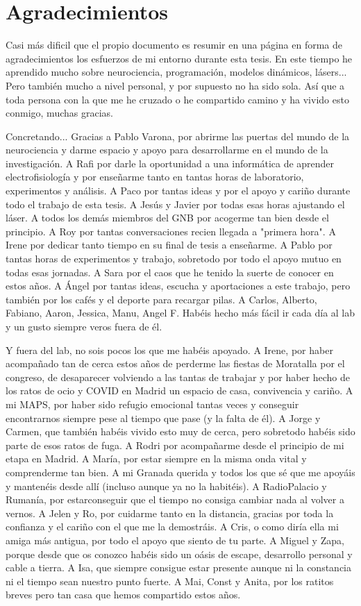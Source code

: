 \chapter*{Agradecimientos}
Casi más dificil que el propio documento es resumir en una página en forma de agradecimientos los esfuerzos de mi entorno durante esta tesis. En este tiempo he aprendido mucho sobre neurociencia, programación, modelos dinámicos, lásers... Pero también mucho a nivel personal, y por supuesto no ha sido sola. Así que a toda persona con la que me he cruzado o he compartido camino y ha vivido esto conmigo, muchas gracias. 

Concretando... Gracias a Pablo Varona, por abrirme las puertas del mundo de la neurociencia y darme espacio y apoyo para desarrollarme en el mundo de la investigación. A Rafi por darle la oportunidad a una informática de aprender electrofisiología y por enseñarme tanto en tantas horas de laboratorio, experimentos y análisis. A Paco por tantas ideas y por el apoyo y cariño durante todo el trabajo de esta tesis. A Jesús y Javier por todas esas horas ajustando el láser. A todos los demás miembros del GNB por acogerme tan bien desde el principio. A Roy por tantas conversaciones recien llegada a "primera hora". A Irene por dedicar tanto tiempo en su final de tesis a enseñarme. A Pablo por tantas horas de experimentos y trabajo, sobretodo por todo el apoyo mutuo en todas esas jornadas. A Sara por el caos que he tenido la suerte de conocer en estos años. A Ángel por tantas ideas, escucha y aportaciones a este trabajo, pero también por los cafés y el deporte para recargar pilas. A Carlos, Alberto, Fabiano, Aaron, Jessica, Manu, Angel F. Habéis hecho más fácil ir cada día al lab y un gusto siempre veros fuera de él. 


Y fuera del lab, no sois pocos los que me habéis apoyado. A Irene, por haber acompañado tan de cerca estos años de perderme las fiestas de Moratalla por el congreso, de desaparecer volviendo a las tantas de trabajar y por haber hecho de los ratos de ocio y COVID en Madrid un espacio de casa, convivencia y cariño. A mi MAPS, por haber sido refugio emocional tantas veces y conseguir encontrarnos siempre pese al tiempo que pase (y la falta de él). A Jorge y Carmen, que también habéis vivido esto muy de cerca, pero sobretodo habéis sido parte de esos ratos de fuga. A Rodri por acompañarme desde el principio de mi etapa en Madrid. A María, por estar siempre en la misma onda vital y comprenderme tan bien. A mi Granada querida y todos los que sé que me apoyáis y mantenéis desde allí (incluso aunque ya no la habitéis). A RadioPalacio y Rumanía, por estarconseguir que el tiempo no consiga cambiar nada al volver a vernos. A Jelen y Ro, por cuidarme tanto en la distancia, gracias por toda la confianza y el cariño con el que me la demostráis. A Cris, o como diría ella mi amiga más antigua, por todo el apoyo que siento de tu parte. A Miguel y Zapa, porque desde que os conozco habéis sido un oásis de escape, desarrollo personal y cable a tierra. A Isa, que siempre consigue estar presente aunque ni la constancia ni el tiempo sean nuestro punto fuerte. A Mai, Const y Anita, por los ratitos breves pero tan casa que hemos compartido estos años.

